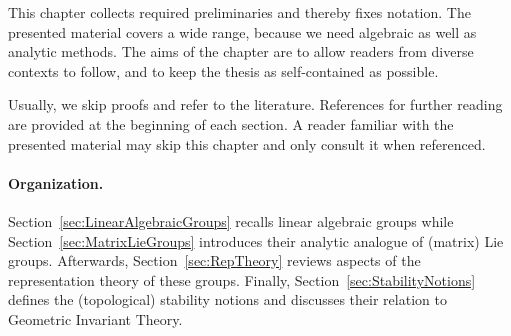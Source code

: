

This chapter collects required preliminaries and thereby fixes notation. The presented material covers a wide range, because we need algebraic as well as analytic methods.
The aims of the chapter are to allow readers from diverse contexts to follow, and to keep the thesis as self-contained as possible.

Usually, we skip proofs and refer to the literature. References for further reading are provided at the beginning of each section.
A reader familiar with the presented material may skip this chapter and only consult it when referenced.


\paragraph{Organization.}
Section~\ref{sec:LinearAlgebraicGroups} recalls linear algebraic groups while Section~\ref{sec:MatrixLieGroups} introduces their analytic analogue of (matrix) Lie groups. Afterwards, Section~\ref{sec:RepTheory} reviews aspects of the representation theory of these groups. Finally, Section~\ref{sec:StabilityNotions} defines the (topological) stability notions and discusses their relation to Geometric Invariant Theory.





